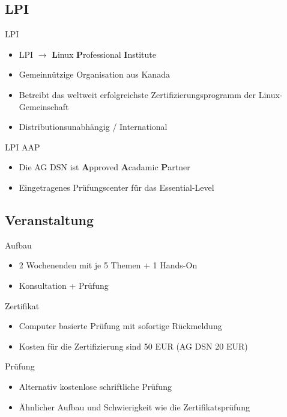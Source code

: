 \documentclass[aspectratio=43]{beamer}
\begin{document}
\subsection{LPI}
\begin{frame} 

	\begin{block}{LPI} 
	\begin{itemize}
	\item LPI $\rightarrow$ \textbf{L}inux \textbf{P}rofessional \textbf{I}nstitute
	\item Gemeinnützige Organisation aus Kanada
	\item Betreibt das weltweit erfolgreichste Zertifizierungsprogramm der Linux-Gemeinschaft
	\item Distributionsunabhängig / International
	\end{itemize}
	\end{block}
	
	\begin{block}{LPI AAP} 
	\begin{itemize}
	\item Die AG DSN ist \textbf{A}pproved \textbf{A}cadamic \textbf{P}artner
	\item Eingetragenes Prüfungscenter für das Essential-Level
	\end{itemize}
	\end{block}
\end{frame}

\subsection{Veranstaltung}
\begin{frame} 
	\begin{block}{Aufbau} 
	\begin{itemize}
	\item 2 Wochenenden mit je 5 Themen + 1 Hands-On
	\item Konsultation + Prüfung
	\end{itemize}
	\end{block}
	
	\begin{block}{Zertifikat} 
	\begin{itemize}
	\item Computer basierte Prüfung mit sofortige Rückmeldung
	\item Kosten für die Zertifizierung sind 50 EUR (AG DSN 20 EUR)
	\end{itemize}
	\end{block}
	
	\begin{block}{Prüfung} 
	\begin{itemize}
	\item Alternativ kostenlose schriftliche Prüfung
	\item Ähnlicher Aufbau und Schwierigkeit wie die Zertifikatsprüfung
	\end{itemize}
	\end{block}
\end{frame}
\end{document}
